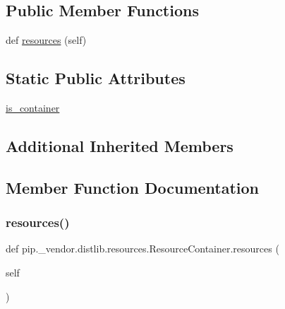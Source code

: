 \subsection*{Public Member Functions}
\begin{DoxyCompactItemize}
\item 
def \hyperlink{classpip_1_1__vendor_1_1distlib_1_1resources_1_1ResourceContainer_af9f4680607f189807015c232be55df0f}{resources} (self)
\end{DoxyCompactItemize}
\subsection*{Static Public Attributes}
\begin{DoxyCompactItemize}
\item 
\hyperlink{classpip_1_1__vendor_1_1distlib_1_1resources_1_1ResourceContainer_a18f56b28366fafa46aefaa20655d6ba0}{is\+\_\+container}
\end{DoxyCompactItemize}
\subsection*{Additional Inherited Members}


\subsection{Member Function Documentation}
\mbox{\label{classpip_1_1__vendor_1_1distlib_1_1resources_1_1ResourceContainer_af9f4680607f189807015c232be55df0f}} 
\subsubsection{\texorpdfstring{resources()}{resources()}}
{\footnotesize\ttfamily def pip.\+\_\+vendor.\+distlib.\+resources.\+Resource\+Container.\+resources (\begin{DoxyParamCaption}\item[{}]{self }\end{DoxyParamCaption})}



